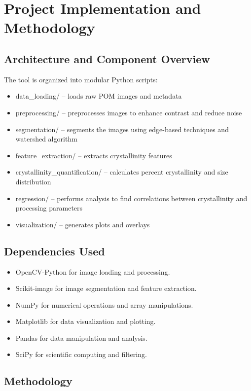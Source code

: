 \documentclass[12pt]{article}
\begin{document}
\section{Project Implementation and Methodology}

\subsection{Architecture and Component Overview}
The tool is organized into modular Python scripts:
\begin{itemize}[noitemsep]
    \item data\_loading/ -- loads raw POM images and metadata
    \item preprocessing/ -- preprocesses images to enhance contrast and reduce noise
    \item segmentation/ -- segments the images using edge-based techniques and watershed algorithm
    \item feature\_extraction/ -- extracts crystallinity features
    \item crystallinity\_quantification/ -- calculates percent crystallinity and size distribution
    \item regression/ -- performs analysis to find correlations between crystallinity and processing parameters
    \item visualization/ -- generates plots and overlays
\end{itemize}

\subsection{Dependencies Used}
\begin{itemize}[noitemsep]
    \item OpenCV-Python for image loading and processing.
    \item Scikit-image for image segmentation and feature extraction.
    \item NumPy for numerical operations and array manipulations.
    \item Matplotlib for data visualization and plotting.
    \item Pandas for data manipulation and analysis.
    \item SciPy for scientific computing and filtering.
\end{itemize}

\subsection{Methodology}
\end{document}
